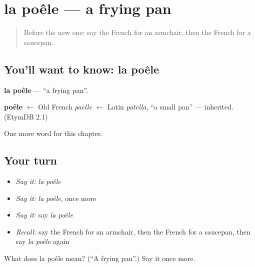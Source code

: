 \section[la poêle]{la poêle — a frying pan}

\label{lesson:FR-C193-poele}



\begin{quote}
Before the new one: say the French for an armchair, then the French for a saucepan.
\end{quote}

\subsection*{You'll want to know: la poêle}
\textbf{la poêle} — \textquotedblleft{}a frying pan\textquotedblright{}.

\begin{cousinweb}
\textbf{poêle} $\leftarrow$ Old French \emph{paelle} $\leftarrow$ Latin \emph{patella}, \textquotedblleft{}a small pan\textquotedblright{} — inherited. (EtymDB 2.1)
\end{cousinweb}

\begin{grammarlens}[title={What you've built}]
One more word for this chapter.
\end{grammarlens}

\subsection*{Your turn}
\begin{itemize}
\raggedright
  \item \emph{Say it:} \emph{la poêle}
  \item \emph{Say it:} \emph{la poêle}, once more
  \item \emph{Say it:} say \emph{la poêle}
  \item \emph{Recall:} say the French for an armchair, then the French for a saucepan, then say \emph{la poêle} again
\end{itemize}

\begin{tcolorbox}[breakable,colback=teal!4,colframe=teal!35!black,title={Before you move on}]
What does la poêle mean? (\textquotedblleft{}A frying pan\textquotedblright{}.) Say it once more.
\end{tcolorbox}
